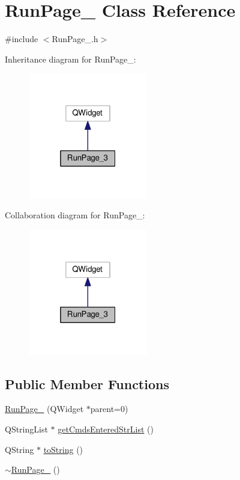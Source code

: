 \hypertarget{class_run_page__3}{\section{Run\-Page\-\_ Class Reference}
\label{class_run_page__3}
}


{\ttfamily \#include $<$Run\-Page\-\_.\-h$>$}



Inheritance diagram for Run\-Page\-\_\-:\nopagebreak
\begin{figure}[H]
\begin{center}
\leavevmode
\includegraphics[width=148pt]{class_run_page__3__inherit__graph}
\end{center}
\end{figure}


Collaboration diagram for Run\-Page\-\_\-:\nopagebreak
\begin{figure}[H]
\begin{center}
\leavevmode
\includegraphics[width=148pt]{class_run_page__3__coll__graph}
\end{center}
\end{figure}
\subsection*{Public Member Functions}
\begin{DoxyCompactItemize}
\item 
\hyperlink{class_run_page__3_a3713a0f3b2200cfea30a6abc64d1c33a}{Run\-Page\-\_} (Q\-Widget $\ast$parent=0)
\item 
Q\-String\-List $\ast$ \hyperlink{class_run_page__3_abf2d4b96a9af6cb018c481e6ac6602e7}{get\-Cmds\-Entered\-Str\-List} ()
\item 
Q\-String $\ast$ \hyperlink{class_run_page__3_a639589290f9b901e395cf336a718b4ca}{to\-String} ()
\item 
\hyperlink{class_run_page__3_a248659036056bb52fa0ed53baa84e319}{$\sim$\-Run\-Page\-\_} ()
\end{DoxyCompactItemize}
